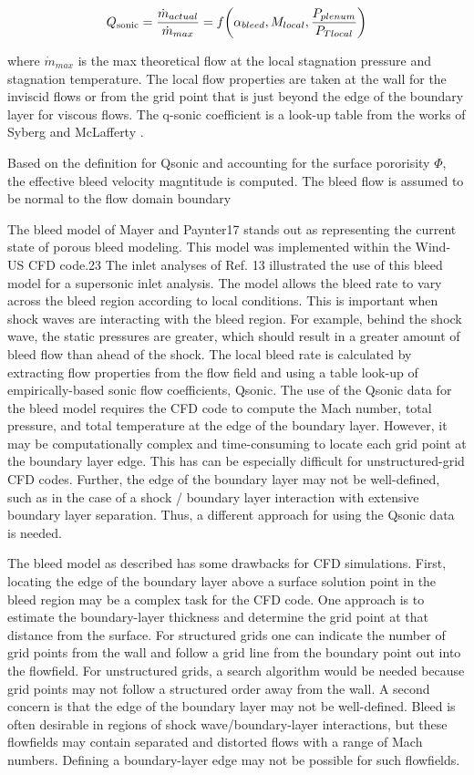 $$ Q_{\textrm{sonic}} = \frac{\dot{m}_{actual}}{\dot{m}_{max}} = f\qty(\alpha_{bleed},M_{local},\dfrac{P_{plenum}}{P_{Tlocal}}) $$

where $\dot{m}_{max}$ is the max theoretical flow at the local stagnation pressure and stagnation temperature. The local flow properties are taken at the wall for the inviscid flows or from the grid point that is just beyond the edge of the boundary layer for viscous flows. The q-sonic coefficient is a look-up table from the works of Syberg \cite{Syberg1973} and McLafferty \cite{McLafferty1958}.

Based on the definition for Qsonic and accounting for the surface pororisity $\Phi$, the effective bleed velocity magntitude is computed. The bleed flow is assumed to be normal to the flow domain boundary

The bleed model of Mayer and Paynter17 stands out as representing the current state of porous bleed modeling. This model was implemented within the Wind-US CFD code.23 The inlet analyses of Ref. 13 illustrated the use of this bleed model for a supersonic inlet analysis. The model allows the bleed rate to vary across the bleed region according to local conditions. This is important when shock waves are interacting with the bleed region. For example, behind the shock wave, the static pressures are greater, which should result in a greater amount of bleed flow than ahead of the shock. The local bleed rate is calculated by extracting flow properties from the flow field and using a table look-up of empirically-based sonic flow coefficients, Qsonic. The use of the Qsonic data for the bleed model requires the CFD code to compute the Mach number, total pressure, and total temperature at the edge of the boundary layer. However, it may be computationally complex and time-consuming to locate each grid point at the boundary layer edge. This has can be especially difficult for unstructured-grid CFD codes. Further, the edge of the boundary layer may not be well-defined, such as in the case of a shock / boundary layer interaction with extensive boundary layer separation. Thus, a different approach for using the Qsonic data is needed.

The bleed model as described has some drawbacks for CFD simulations. First, locating the edge of the boundary layer above a surface solution point in the bleed region may be a complex task for the CFD code. One approach is to estimate the boundary-layer thickness and determine the grid point at that distance from the surface. For structured grids one can indicate the number of grid points from the wall and follow a grid line from the boundary point out into the flowfield. For unstructured grids, a search algorithm would be needed because grid points may not follow a structured order away from the wall. A second concern is that the edge of the boundary layer may not be well-defined. Bleed is often desirable in regions of shock wave/boundary-layer interactions, but these flowfields may contain separated and distorted flows with a range of Mach numbers. Defining a boundary-layer edge may not be possible for such flowfields.

